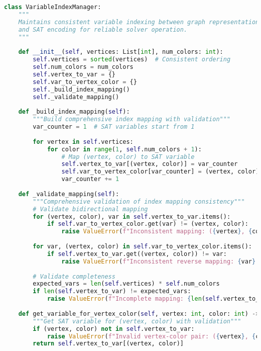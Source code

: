 \begin{lstlisting}[language=Python, caption=Variable Indexing Consistency for Reliable Operation]
class VariableIndexManager:
    """
    Maintains consistent variable indexing between graph representation
    and SAT encoding for reliable solver operation.
    """
    
    def __init__(self, vertices: List[int], num_colors: int):
        self.vertices = sorted(vertices)  # Consistent ordering
        self.num_colors = num_colors
        self.vertex_to_var = {}
        self.var_to_vertex_color = {}
        self._build_index_mapping()
        self._validate_mapping()
    
    def _build_index_mapping(self):
        """Build comprehensive index mapping with validation"""
        var_counter = 1  # SAT variables start from 1
        
        for vertex in self.vertices:
            for color in range(1, self.num_colors + 1):
                # Map (vertex, color) to SAT variable
                self.vertex_to_var[(vertex, color)] = var_counter
                self.var_to_vertex_color[var_counter] = (vertex, color)
                var_counter += 1
    
    def _validate_mapping(self):
        """Comprehensive validation of index mapping consistency"""
        # Validate bidirectional mapping
        for (vertex, color), var in self.vertex_to_var.items():
            if self.var_to_vertex_color.get(var) != (vertex, color):
                raise ValueError(f"Inconsistent mapping: ({vertex}, {color}) -> {var}")
        
        for var, (vertex, color) in self.var_to_vertex_color.items():
            if self.vertex_to_var.get((vertex, color)) != var:
                raise ValueError(f"Inconsistent reverse mapping: {var} -> ({vertex}, {color})")
        
        # Validate completeness
        expected_vars = len(self.vertices) * self.num_colors
        if len(self.vertex_to_var) != expected_vars:
            raise ValueError(f"Incomplete mapping: {len(self.vertex_to_var)} != {expected_vars}")
    
    def get_variable_for_vertex_color(self, vertex: int, color: int) -> int:
        """Get SAT variable for (vertex, color) with validation"""
        if (vertex, color) not in self.vertex_to_var:
            raise ValueError(f"Invalid vertex-color pair: ({vertex}, {color})")
        return self.vertex_to_var[(vertex, color)]
    

\end{lstlisting}

